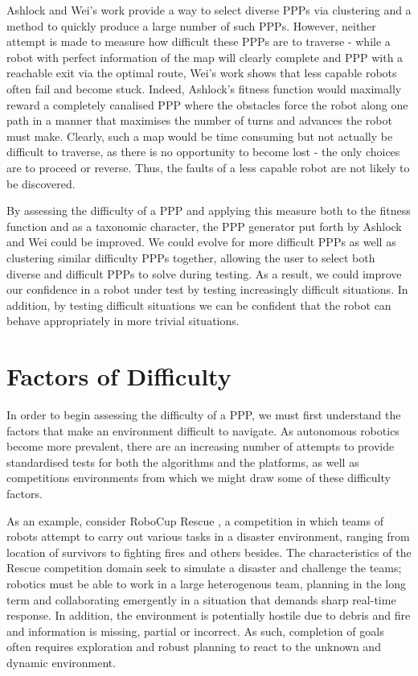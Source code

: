 \documentclass[authoryearcitations]{UoYCSproject}
\begin{document}
Ashlock and Wei's work provide a way to select diverse PPPs via clustering and a method to quickly produce a large number of such PPPs. However, neither attempt is made to measure how difficult these PPPs are to traverse - while a robot with perfect information of the map will clearly complete and PPP with a reachable exit via the optimal route, Wei's work shows that less capable robots often fail and become stuck. Indeed, Ashlock's fitness function would maximally reward a completely canalised PPP where the obstacles force the robot along one path in a manner that maximises the number of turns and advances the robot must make. Clearly, such a map would be time consuming but not actually be difficult to traverse, as there is no opportunity to become lost - the only choices are to proceed or reverse. Thus, the faults of a less capable robot are not likely to be discovered. 

By assessing the difficulty of a PPP and applying this measure both to the fitness function and as a taxonomic character, the PPP generator put forth by Ashlock and Wei could be improved. We could evolve for more difficult PPPs as well as clustering similar difficulty PPPs together, allowing the user to select both diverse and difficult PPPs to solve during testing. As a result, we could improve our confidence in a robot under test by testing increasingly difficult situations. In addition, by testing difficult situations we can be confident that the robot can behave appropriately in more trivial situations.


\section{Factors of Difficulty}
\label{sec:lit3}
In order to begin assessing the difficulty of a PPP, we must first understand the factors that make an environment difficult to navigate. As autonomous robotics become more prevalent, there are an increasing number of attempts to provide standardised tests for both the algorithms and the platforms, as well as competitions environments from which we might draw some of these difficulty factors. 

As an example, consider RoboCup Rescue \cite{robocup}, a competition in which teams of robots attempt to carry out various tasks in a disaster environment, ranging from location of survivors to fighting fires and others besides. The characteristics of the Rescue competition domain seek to simulate a disaster and challenge the teams; robotics must be able to work in a large heterogenous team, planning in the long term and collaborating emergently in a situation that demands sharp real-time response. In addition, the environment is potentially hostile due to debris and fire and information is missing, partial or incorrect. As such, completion of goals often requires exploration and robust planning to react to the unknown and dynamic environment.
\end{document}
